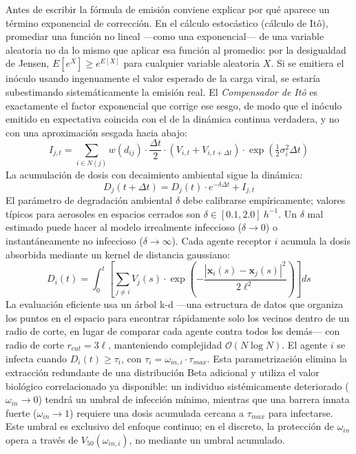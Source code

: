 \documentclass[conference]{IEEEtran}
\begin{document}
Antes de escribir la fórmula de emisión conviene explicar por qué aparece un término exponencial de corrección. En el cálculo estocástico (cálculo de Itô), promediar una función no lineal ---como una exponencial--- de una variable aleatoria no da lo mismo que aplicar esa función al promedio: por la desigualdad de Jensen, $E[e^X] \geq e^{E[X]}$ para cualquier variable aleatoria $X$. Si se emitiera el inóculo usando ingenuamente el valor esperado de la carga viral, se estaría subestimando sistemáticamente la emisión real. El \emph{Compensador de Itô} es exactamente el factor exponencial que corrige ese sesgo, de modo que el inóculo emitido en expectativa coincida con el de la dinámica continua verdadera, y no con una aproximación sesgada hacia abajo:
\begin{equation}
I_{j,t} = \sum_{i \in N(j)} w(d_{ij}) \cdot \frac{\Delta t}{2} \cdot (V_{i,t} + V_{i,t+\Delta t}) \cdot \exp\!\left(\tfrac{1}{2}\sigma_i^2 \Delta t\right)
\end{equation}
La acumulación de dosis con decaimiento ambiental sigue la dinámica:
\begin{equation}
D_j(t + \Delta t) = D_j(t) \cdot e^{-\delta \Delta t} + I_{j,t}
\end{equation}
El parámetro de degradación ambiental $\delta$ debe calibrarse empíricamente; valores típicos para aerosoles en espacios cerrados son $\delta \in [0.1, 2.0]\ h^{-1}$. Un $\delta$ mal estimado puede hacer al modelo irrealmente infeccioso ($\delta \to 0$) o instantáneamente no infeccioso ($\delta \to \infty$). Cada agente receptor $i$ acumula la dosis absorbida mediante un kernel de distancia gaussiano:
\begin{equation}
D_i(t) = \int_0^t \left[\sum_{j \neq i} V_j(s) \cdot \exp\!\left(-\frac{|\mathbf{x}_i(s) - \mathbf{x}_j(s)|^2}{2\ell^2}\right)\right] ds
\end{equation}
La evaluación eficiente usa un árbol k-d ---una estructura de datos que organiza los puntos en el espacio para encontrar rápidamente solo los vecinos dentro de un radio de corte, en lugar de comparar cada agente contra todos los demás--- con radio de corte $r_{cut}=3\ell$, manteniendo complejidad $\mathcal{O}(N\log N)$. El agente $i$ se infecta cuando $D_i(t) \geq \tau_i$, con $\tau_i = \omega_{in,i} \cdot \tau_{max}$. Esta parametrización elimina la extracción redundante de una distribución Beta adicional y utiliza el valor biológico correlacionado ya disponible: un individuo sistémicamente deteriorado ($\omega_{in}\to 0$) tendrá un umbral de infección mínimo, mientras que una barrera innata fuerte ($\omega_{in}\to 1$) requiere una dosis acumulada cercana a $\tau_{max}$ para infectarse. Este umbral es exclusivo del enfoque continuo; en el discreto, la protección de $\omega_{in}$ opera a través de $V_{50}(\omega_{in,i})$, no mediante un umbral acumulado.
\end{document}
